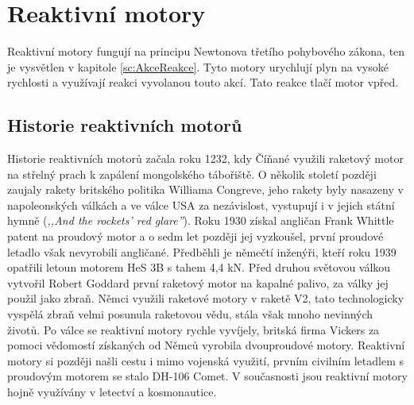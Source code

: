 \section{Reaktivní motory}
{Reaktivní motory fungují na principu Newtonova třetího pohybového zákona, ten je vysvětlen v kapitole \ref{sc:AkceReakce}. Tyto motory urychlují plyn na vysoké rychlosti a využívají reakci vyvolanou touto akcí. Tato reakce tlačí motor vpřed.}

\subsection{Historie reaktivních motorů}
{Historie reaktivních motorů začala roku 1232, kdy Číňané využili raketový motor na střelný prach k zapálení mongolského tábořiště. O několik století později zaujaly rakety britského politika Williama Congreve, jeho rakety byly nasazeny v napoleonských válkách a ve válce USA za nezávislost, vystupují i v jejich státní hymně (\textit{,,And the rockets' red glare''}).}
\cite{VUTB:NavrhRaketovehoMotoru}\odst
{Roku 1930 získal angličan Frank Whittle patent na proudový motor a o sedm let později jej vyzkoušel, první proudové letadlo však nevyrobili angličané. Předběhli je němečtí inženýři, kteří roku 1939 opatřili letoun motorem HeS 3B s tahem 4,4 kN.}
\cite{VUTB:PrehledTechnickychAspektuVyvojeLeteckychProudovychMotoru}\odst
{Před druhou světovou válkou vytvořil Robert Goddard první raketový motor na kapalné palivo, za války jej použil jako zbraň. Němci využili raketové motory v raketě V2, tato technologicky vyspělá zbraň velmi posunula raketovou vědu, stála však mnoho nevinných životů.}
\cite{VUTB:NavrhRaketovehoMotoru}\odst
{Po válce se reaktivní motory rychle vyvíjely, britská firma Vickers za pomoci vědomostí získaných od Němců vyrobila dvouproudové motory. Reaktivní motory si později našli cestu i mimo vojenská využití, prvním civilním letadlem s proudovým motorem se stalo DH-106 Comet. V současnosti jsou reaktivní motory hojně využívány v letectví a kosmonautice.}
\cite{VUTB:PrehledTechnickychAspektuVyvojeLeteckychProudovychMotoru}

